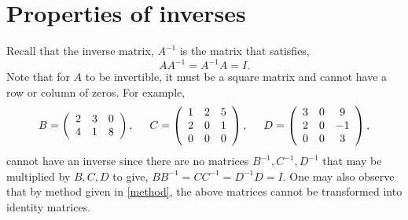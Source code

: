 \documentclass{ximera}
\begin{document}
\section*{Properties of inverses}
Recall that the inverse matrix, $A^{-1}$ is the matrix that satisfies,
\begin{equation*}
AA^{-1}= A^{-1}A= I.
\end{equation*}
Note that for $A$ to be invertible, it must be a square matrix and cannot have a row or column of zeros. For example,
 \[B= \left(\begin{array}{ccc}
  2 &  3 & 0 \\
  4 &  1 & 8
\end{array}\right), \hspace{.5cm} C= \left(\begin{array}{ccc}
  1 &  2 & 5 \\
  2 &  0 & 1 \\
  0 & 0& 0
\end{array}\right), \hspace{.5cm} D = \left(\begin{array}{ccc}
  3 &  0 & 9 \\
  2 &  0 & -1 \\
  0 & 0& 3
\end{array}\right),
\]
cannot have an inverse since there are no matrices $B^{-1}, C^{-1}, D^{-1}$ that may be multiplied by $B,C,D$ to give, $BB^{-1}= CC^{-1}=D^{-1}D=I$. One may also observe that by method given in \eqref{method}, the above matrices cannot be transformed into identity matrices.
\end{document}

